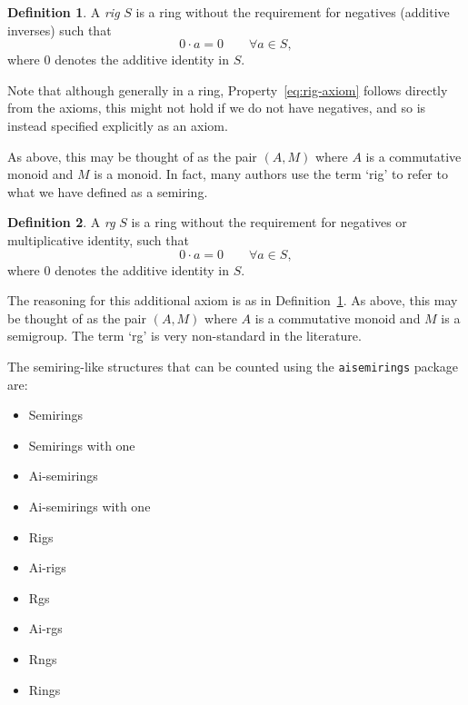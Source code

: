 \documentclass{article}
\theoremstyle{definition}
\newtheorem{defn}{Definition}[section]
\theoremstyle{plain}
\begin{document}
\begin{defn}
  \label{def:rig}
  A \emph{rig} \(S\) is a ring without the requirement for negatives
  (additive inverses) such that
  \begin{equation}
    \label{eq:rig-axiom}
    0\cdot a=0\qquad\forall a\in S,
  \end{equation}
  where \(0\) denotes the additive identity in \(S\).

  Note that although generally in a ring,
  Property~\eqref{eq:rig-axiom} follows directly from the axioms,
  this might not hold if we do not have negatives, and so is instead
  specified explicitly as an axiom.

  As above, this may be thought of as the pair \((A, M)\) where \(A\)
  is a commutative monoid and \(M\) is a monoid. In fact, many
  authors use the term `rig' to refer to what we have defined as a semiring.

\end{defn}
\begin{defn}
  A \emph{rg} \(S\) is a ring without the requirement for negatives
  or multiplicative identity, such that
  \begin{equation*}
    0\cdot a=0\qquad\forall a\in S,
  \end{equation*}
  where \(0\) denotes the additive identity in \(S\).

  The reasoning for this additional axiom is as in
  Definition~\ref{def:rig}. As above, this may be thought of as the
  pair \((A, M)\) where \(A\) is a commutative monoid and \(M\) is a
  semigroup. The term `rg' is very non-standard in the literature.
\end{defn}

The semiring-like structures that can be counted using the
\texttt{aisemirings} package are:

\begin{multicols}{2}
  \begin{itemize}
    \item Semirings
    \item Semirings with one
    \item Ai-semirings
    \item Ai-semirings with one
    \item Rigs
    \item Ai-rigs
    \item Rgs
    \item Ai-rgs
    \item Rngs
    \item Rings
  \end{itemize}
\end{multicols}
\end{document}
